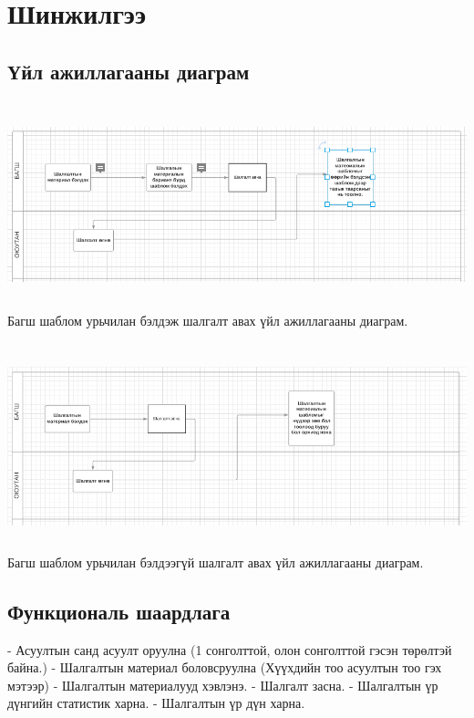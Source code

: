 
\section{Шинжилгээ }
\subsection{Үйл ажиллагааны диаграм}
\includegraphics[width=15cm,height=6cm, scale=0.5]{Figures/ac1.png}
\hspace*{0pt}\hfill Багш шаблом урьчилан бэлдэж шалгалт авах үйл ажиллагааны диаграм.
\newline
\newline

\includegraphics[width=15cm,height=6cm, scale=0.5]{Figures/ac2.png}
\hspace*{0pt}\hfill Багш шаблом урьчилан бэлдээгүй шалгалт авах үйл ажиллагааны диаграм.
\newline
\subsection{Функциональ шаардлага}
\begin{flushleft}
- Асуултын санд асуулт оруулна (1 сонголттой, олон сонголттой гэсэн төрөлтэй байна.)
\linebreak
- Шалгалтын материал боловсруулна (Хүүхдийн тоо асуултын тоо гэх мэтээр)
\linebreak
- Шалгалтын материалууд хэвлэнэ.\linebreak
- Шалгалт засна.\linebreak
- Шалгалтын үр дүнгийн статистик харна.
- Шалгалтын үр дүн харна.\linebreak
\end{flushleft}
